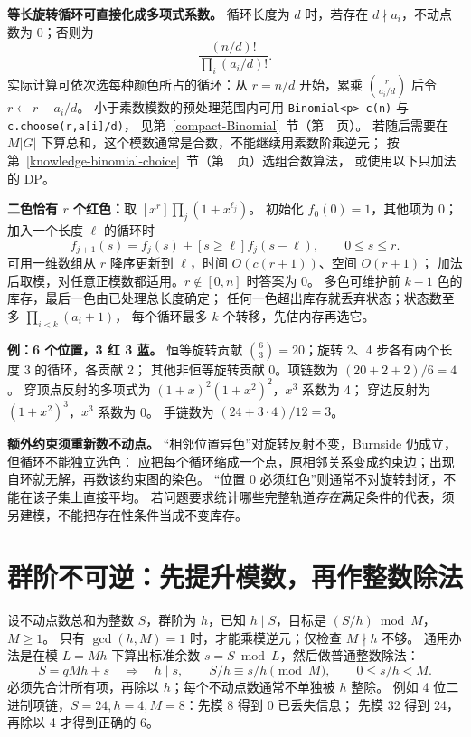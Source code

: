 \textbf{等长旋转循环可直接化成多项式系数。}
循环长度为 $d$ 时，若存在 $d\nmid a_i$，不动点数为 0；否则为
\[
\frac{(n/d)!}{\prod_i(a_i/d)!}.
\]
实际计算可依次选每种颜色所占的循环：从 $r=n/d$ 开始，累乘
$\binom{r}{a_i/d}$ 后令 $r\leftarrow r-a_i/d$。
小于素数模数的预处理范围内可用
\texttt{Binomial<p> c(n)} 与 \texttt{c.choose(r,a[i]/d)}，
见第~\ref{compact-Binomial}~节（第~\pageref{compact-Binomial}~页）。
若随后需要在 $M|G|$ 下算总和，这个模数通常是合数，不能继续用素数阶乘逆元；
按第~\ref{knowledge-binomial-choice}~节（第~\pageref{knowledge-binomial-choice}~页）选组合数算法，
或使用以下只加法的 DP。

\textbf{二色恰有 $r$ 个红色：}取 $[x^r]\prod_j(1+x^{\ell_j})$。
初始化 $f_0(0)=1$，其他项为 0；加入一个长度 $\ell$ 的循环时
\[
f_{j+1}(s)=f_j(s)+[s\ge\ell]f_j(s-\ell),\qquad 0\le s\le r.
\]
可用一维数组从 $r$ 降序更新到 $\ell$，时间 $O(c(r+1))$、空间 $O(r+1)$；
加法后取模，对任意正模数都适用。$r\notin[0,n]$ 时答案为 0。
多色可维护前 $k-1$ 色的库存，最后一色由已处理总长度确定；
任何一色超出库存就丢弃状态；状态数至多 $\prod_{i<k}(a_i+1)$，
每个循环最多 $k$ 个转移，先估内存再选它。

\textbf{例：6 个位置，3 红 3 蓝。}
恒等旋转贡献 $\binom63=20$；旋转 2、4 步各有两个长度 3 的循环，各贡献 2；
其他非恒等旋转贡献 0。项链数为 $(20+2+2)/6=4$。
穿顶点反射的多项式为 $(1+x)^2(1+x^2)^2$，$x^3$ 系数为 4；
穿边反射为 $(1+x^2)^3$，$x^3$ 系数为 0。
手链数为 $(24+3\cdot4)/12=3$。

\textbf{额外约束须重新数不动点。}
“相邻位置异色”对旋转反射不变，Burnside 仍成立，但循环不能独立选色：
应把每个循环缩成一个点，原相邻关系变成约束边；出现自环就无解，再数该约束图的染色。
“位置 0 必须红色”则通常不对旋转封闭，不能在该子集上直接平均。
若问题要求统计哪些完整轨道\emph{存在}满足条件的代表，须另建模，不能把存在性条件当成不变库存。

\section{群阶不可逆：先提升模数，再作整数除法}\label{knowledge-orbits-modular}
设不动点数总和为整数 $S$，群阶为 $h$，已知 $h\mid S$，目标是 $(S/h)\bmod M$，$M\ge1$。
只有 $\gcd(h,M)=1$ 时，才能乘模逆元；仅检查 $M\nmid h$ 不够。
通用办法是在模 $L=Mh$ 下算出标准余数 $s=S\bmod L$，然后做普通整数除法：
\[
S=qMh+s\quad\Longrightarrow\quad
h\mid s,\qquad S/h\equiv s/h\pmod M,\qquad 0\le s/h<M.
\]
必须先合计所有项，再除以 $h$；每个不动点数通常不单独被 $h$ 整除。
例如 4 位二进制项链，$S=24,h=4,M=8$：先模 8 得到 0 已丢失信息；
先模 32 得到 24，再除以 4 才得到正确的 6。

